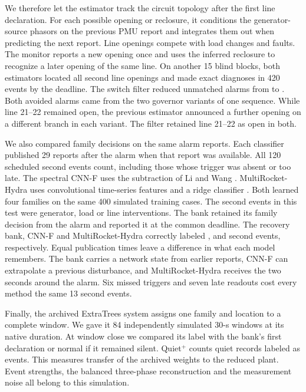 We therefore let the estimator track the circuit topology after the
first line declaration. For each possible opening or reclosure, it
conditions the generator-source phasors on the previous PMU report
and integrates them out when predicting the next report. Line
openings compete with load changes and faults. The monitor reports
a new opening once and uses the inferred reclosure to recognize a
later opening of the same line. On another 15 blind blocks, both
estimators located all \SwNewSecond{} second line openings and
made \SwNewJoint{} exact diagnoses in 420 events by the deadline.
The switch filter reduced unmatched alarms from \SwOldExtras{}
to \SwNewExtras{}. Both avoided alarms came from the two
governor variants of one sequence. While line 21--22 remained
open, the previous estimator announced a further opening on
a different branch in each variant. The filter retained line
21--22 as open in both.

We also compared family decisions on the same alarm reports. Each
classifier published 29 reports after the alarm when that report was
available.
All 120 scheduled second events count, including those whose trigger
was absent or too late. The spectral CNN-F uses the subtraction of
Li and Wang \cite{liwang2019successive}. MultiRocket-Hydra uses
convolutional time-series features and a ridge classifier
\cite{dempster2023hydra,middlehurst2024bakeoff}. Both learned four families on the same
400 simulated training cases. The second events in this test were
generator, load or line interventions. The bank retained its family
decision from the alarm and reported it at the common deadline. The
recovery bank, CNN-F and MultiRocket-Hydra correctly labeled
\RepBankSecond{}, \RepCnnSecond{} and \RepHydraSecond{} second events,
respectively. Equal publication times leave a difference in what each
model remembers. The bank carries a network state from earlier reports,
CNN-F can extrapolate a previous disturbance, and MultiRocket-Hydra
receives the two seconds around the alarm. Six missed triggers and
seven late readouts cost every method the same 13 second events.

Finally, the archived ExtraTrees system assigns one family and
location to a complete window. We gave it 84 independently simulated
30-s windows at its native duration. At window close we compared its
label with the bank's first declaration or normal if it remained
silent. Quiet$^+$ counts quiet records labeled as events. This measures
transfer of the archived weights to the reduced plant. Event strengths,
the balanced three-phase reconstruction and the measurement noise all
belong to this simulation.
